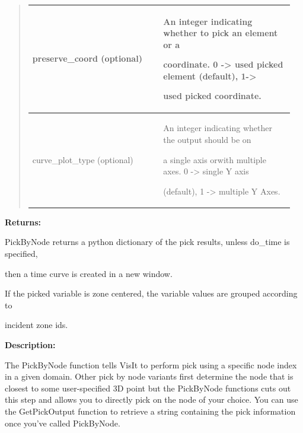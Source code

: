 \documentclass[letterpaper,10pt,english]{sphinxmanual}
\begin{document}
\begin{quote}
\begin{tabular}{|p{0.475\linewidth}|p{0.475\linewidth}|}
\hline
preserve\_coord (optional)
 & 
\begin{DUlineblock}{0em}
\item[] An integer indicating whether to pick an element or a
\item[] coordinate. 0 -\textgreater{} used picked element (default), 1-\textgreater{}
\item[] used picked coordinate.
\end{DUlineblock}
\\
\hline
curve\_plot\_type (optional)
 & 
\begin{DUlineblock}{0em}
\item[] An integer indicating whether the output should be on
\item[] a single axis orwith multiple axes. 0 -\textgreater{} single Y axis
\item[] (default), 1 -\textgreater{} multiple Y Axes.
\end{DUlineblock}
\\
\hline\end{tabular}

\end{quote}

\begin{DUlineblock}{0em}
\item[] 
\item[] \textbf{Returns:}
\item[] PickByNode returns a python dictionary of the pick results, unless do\_time is specified,
\item[] then a time curve is created in a new window.
\item[] If the picked variable is zone centered, the variable values are grouped according to
\item[] incident zone ids.
\item[] 
\item[] \textbf{Description:}
\item[] The PickByNode function tells VisIt to perform pick using a specific node
index in a given domain. Other pick by node variants first determine the
node that is closest to some user-specified 3D point but the PickByNode
functions cuts out this step and allows you to directly pick on the node of
your choice. You can use the GetPickOutput function to retrieve a string
containing the pick information once you've called PickByNode.
\end{DUlineblock}

\begin{DUlineblock}{0em}
\item[] 
\end{DUlineblock}
\end{document}
